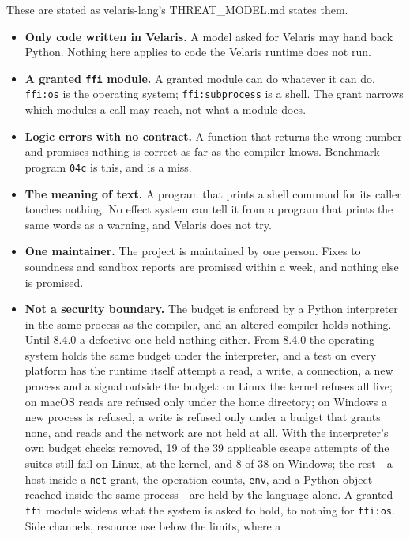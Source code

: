 \documentclass[
]{article}
\newcounter{none} %
\providecommand{\tightlist}{%
  \setlength{\itemsep}{0pt}\setlength{\parskip}{0pt}}
\begin{document}
These are stated as velaris-lang's THREAT\_MODEL.md states them.

\begin{itemize}
\tightlist
\item
  \textbf{Only code written in Velaris.} A model asked for Velaris may
  hand back Python. Nothing here applies to code the Velaris runtime
  does not run.
\item
  \textbf{A granted \texttt{ffi} module.} A granted module can do
  whatever it can do. \texttt{ffi:os} is the operating system;
  \texttt{ffi:subprocess} is a shell. The grant narrows which modules a
  call may reach, not what a module does.
\item
  \textbf{Logic errors with no contract.} A function that returns the
  wrong number and promises nothing is correct as far as the compiler
  knows. Benchmark program \texttt{04c} is this, and is a miss.
\item
  \textbf{The meaning of text.} A program that prints a shell command
  for its caller touches nothing. No effect system can tell it from a
  program that prints the same words as a warning, and Velaris does not
  try.
\item
  \textbf{One maintainer.} The project is maintained by one person.
  Fixes to soundness and sandbox reports are promised within a week, and
  nothing else is promised.
\item
  \textbf{Not a security boundary.} The budget is enforced by a Python
  interpreter in the same process as the compiler, and an altered
  compiler holds nothing. Until 8.4.0 a defective one held nothing
  either. From 8.4.0 the operating system holds the same budget under
  the interpreter, and a test on every platform has the runtime itself
  attempt a read, a write, a connection, a new process and a signal
  outside the budget: on Linux the kernel refuses all five; on macOS
  reads are refused only under the home directory; on Windows a new
  process is refused, a write is refused only under a budget that grants
  none, and reads and the network are not held at all. With the
  interpreter's own budget checks removed, 19 of the 39 applicable
  escape attempts of the suites still fail on Linux, at the kernel, and
  8 of 38 on Windows; the rest - a host inside a \texttt{net} grant, the
  operation counts, \texttt{env}, and a Python object reached inside the
  same process - are held by the language alone. A granted \texttt{ffi}
  module widens what the system is asked to hold, to nothing for
  \texttt{ffi:os}. Side channels, resource use below the limits, where a

\end{itemize}
\end{document}
